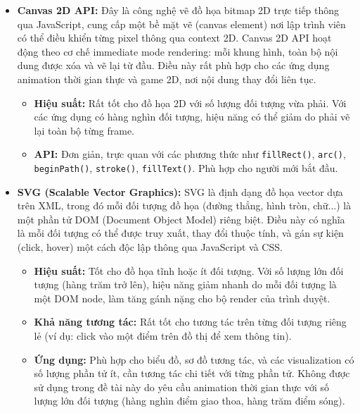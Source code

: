 \begin{itemize}
    \item \textbf{Canvas 2D API:} Đây là công nghệ vẽ đồ họa bitmap 2D trực tiếp thông qua JavaScript, cung cấp một bề mặt vẽ (canvas element) nơi lập trình viên có thể điều khiển từng pixel thông qua context 2D. Canvas 2D API hoạt động theo cơ chế immediate mode rendering: mỗi khung hình, toàn bộ nội dung được xóa và vẽ lại từ đầu. Điều này rất phù hợp cho các ứng dụng animation thời gian thực và game 2D, nơi nội dung thay đổi liên tục.
    \begin{itemize}
        \item \textbf{Hiệu suất:} Rất tốt cho đồ họa 2D với số lượng đối tượng vừa phải. Với các ứng dụng có hàng nghìn đối tượng, hiệu năng có thể giảm do phải vẽ lại toàn bộ từng frame.
        \item \textbf{API:} Đơn giản, trực quan với các phương thức như \texttt{fillRect()}, \texttt{arc()}, \texttt{beginPath()}, \texttt{stroke()}, \texttt{fillText()}. Phù hợp cho người mới bắt đầu.
    \end{itemize}
    
    \item \textbf{SVG (Scalable Vector Graphics):} SVG là định dạng đồ họa vector dựa trên XML, trong đó mỗi đối tượng đồ họa (đường thẳng, hình tròn, chữ...) là một phần tử DOM (Document Object Model) riêng biệt. Điều này có nghĩa là mỗi đối tượng có thể được truy xuất, thay đổi thuộc tính, và gán sự kiện (click, hover) một cách độc lập thông qua JavaScript và CSS.
    \begin{itemize}
        \item \textbf{Hiệu suất:} Tốt cho đồ họa tĩnh hoặc ít đối tượng. Với số lượng lớn đối tượng (hàng trăm trở lên), hiệu năng giảm nhanh do mỗi đối tượng là một DOM node, làm tăng gánh nặng cho bộ render của trình duyệt.
        \item \textbf{Khả năng tương tác:} Rất tốt cho tương tác trên từng đối tượng riêng lẻ (ví dụ: click vào một điểm trên đồ thị để xem thông tin).
        \item \textbf{Ứng dụng:} Phù hợp cho biểu đồ, sơ đồ tương tác, và các visualization có số lượng phần tử ít, cần tương tác chi tiết với từng phần tử. Không được sử dụng trong đề tài này do yêu cầu animation thời gian thực với số lượng lớn đối tượng (hàng nghìn điểm giao thoa, hàng trăm điểm sóng).
    \end{itemize}
    

\end{itemize}
